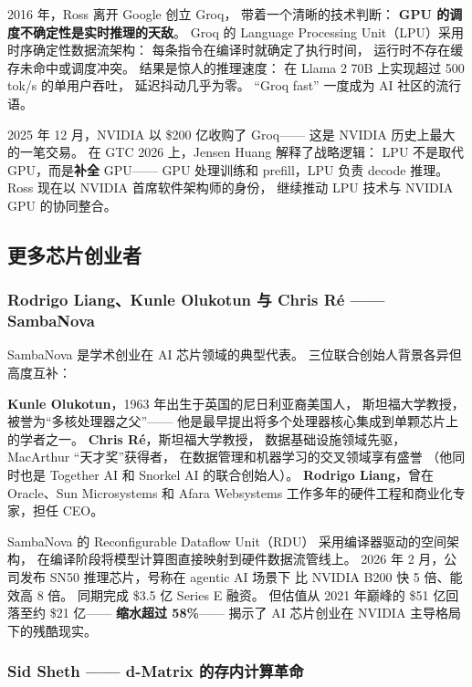 2016 年，Ross 离开 Google 创立 Groq，
带着一个清晰的技术判断：
\textbf{GPU 的调度不确定性是实时推理的天敌}。
Groq 的 Language Processing Unit（LPU）采用
时序确定性数据流架构：
每条指令在编译时就确定了执行时间，
运行时不存在缓存未命中或调度冲突。
结果是惊人的推理速度：
在 Llama 2 70B 上实现超过 500 tok/s 的单用户吞吐，
延迟抖动几乎为零。
``Groq fast'' 一度成为 AI 社区的流行语。

2025 年 12 月，NVIDIA 以 \$200 亿收购了 Groq——
这是 NVIDIA 历史上最大的一笔交易。
在 GTC 2026 上，Jensen Huang 解释了战略逻辑：
LPU 不是取代 GPU，而是\textbf{补全} GPU——
GPU 处理训练和 prefill，LPU 负责 decode 推理。
Ross 现在以 NVIDIA 首席软件架构师的身份，
继续推动 LPU 技术与 NVIDIA GPU 的协同整合。

\subsection{更多芯片创业者}
\label{subsec:more-chip-founders}

\subsubsection{Rodrigo Liang、Kunle Olukotun 与 Chris R\'{e} —— SambaNova}

SambaNova 是学术创业在 AI 芯片领域的典型代表。
三位联合创始人背景各异但高度互补：

\textbf{Kunle Olukotun}，1963 年出生于英国的尼日利亚裔美国人，
斯坦福大学教授，被誉为``多核处理器之父''——
他是最早提出将多个处理器核心集成到单颗芯片上的学者之一。
\textbf{Chris R\'{e}}，斯坦福大学教授，
数据基础设施领域先驱，MacArthur ``天才奖''获得者，
在数据管理和机器学习的交叉领域享有盛誉
（他同时也是 Together AI 和 Snorkel AI 的联合创始人）。
\textbf{Rodrigo Liang}，曾在 Oracle、Sun Microsystems
和 Afara Websystems 工作多年的硬件工程和商业化专家，担任 CEO。

SambaNova 的 Reconfigurable Dataflow Unit（RDU）
采用编译器驱动的空间架构，
在编译阶段将模型计算图直接映射到硬件数据流管线上。
2026 年 2 月，公司发布 SN50 推理芯片，号称在 agentic AI 场景下
比 NVIDIA B200 快 5 倍、能效高 8 倍。
同期完成 \$3.5 亿 Series E 融资。
但估值从 2021 年巅峰的 \$51 亿回落至约 \$21 亿——
\textbf{缩水超过 58\%}——
揭示了 AI 芯片创业在 NVIDIA 主导格局下的残酷现实。

\subsubsection{Sid Sheth —— d-Matrix 的存内计算革命}

